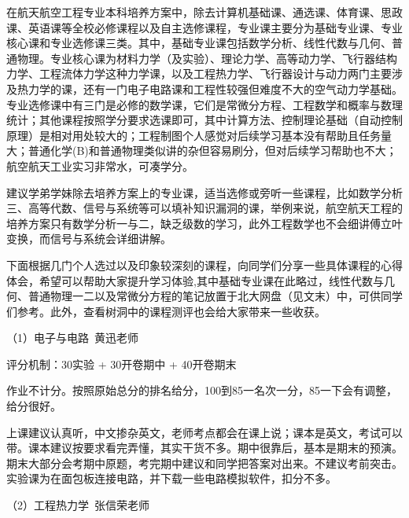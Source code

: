 \documentclass[11pt,oneside]{book}
\begin{document}
\vspace{10pt}

在航天航空工程专业本科培养方案中，除去计算机基础课、通选课、体育课、思政课、英语课等全校必修课程以及自主选修课程，专业课主要分为基础专业课、专业核心课和专业选修课三类。其中，基础专业课包括数学分析、线性代数与几何、普通物理。专业核心课为材料力学（及实验）、理论力学、高等动力学、飞行器结构力学、工程流体力学这种力学课，以及工程热力学、飞行器设计与动力两门主要涉及热力学的课，还有一门电子电路课和工程性较强但难度不大的空气动力学基础。专业选修课中有三门是必修的数学课，它们是常微分方程、工程数学和概率与数理统计；其他课程按照学分要求选课即可，其中计算方法、控制理论基础（自动控制原理）是相对用处较大的；工程制图个人感觉对后续学习基本没有帮助且任务量大；普通化学(B)和普通物理类似讲的杂但容易刷分，但对后续学习帮助也不大；航空航天工业实习非常水，可凑学分。

\vspace{10pt}

建议学弟学妹除去培养方案上的专业课，适当选修或旁听一些课程，比如数学分析三、高等代数、信号与系统等可以填补知识漏洞的课，举例来说，航空航天工程的培养方案只有数学分析一与二，缺乏级数的学习，此外工程数学也不会细讲傅立叶变换，而信号与系统会详细讲解。

\vspace{10pt}

下面根据几门个人选过以及印象较深刻的课程，向同学们分享一些具体课程的心得体会，希望可以帮助大家提升学习体验,其中基础专业课在此略过，线性代数与几何、普通物理一二以及常微分方程的笔记放置于北大网盘（见文末）中，可供同学们参考。此外，查看树洞中的课程测评也会给大家带来一些收获。

\vspace{10pt}

（1）电子与电路\ 黄迅老师 

评分机制：30实验 + 30开卷期中 + 40开卷期末

作业不计分。按照原始总分的排名给分，100到85一名次一分，85一下会有调整，给分很好。

\vspace{10pt}

上课建议认真听，中文掺杂英文，老师考点都会在课上说；课本是英文，考试可以带。课本建议按要求看完弄懂，其实干货不多。期中很靠后，基本是期末的预演。期末大部分会考期中原题，考完期中建议和同学把答案对出来。不建议考前突击。实验课为在面包板连接电路，并下载一些电路模拟软件，扣分不多。

\vspace{10pt}

（2）工程热力学\ 张信荣老师
\end{document}
